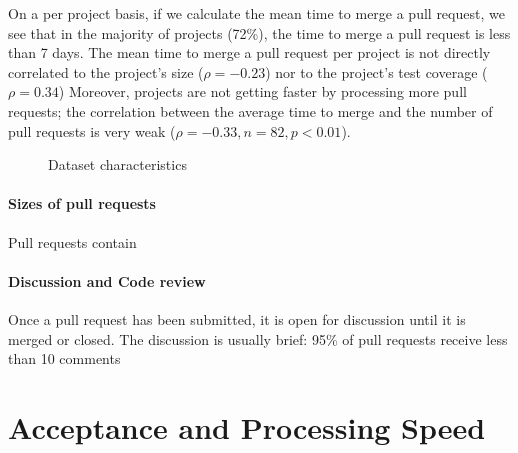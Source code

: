\documentclass{sig-alternate}
\begin{document}
On a per project basis, if we calculate the mean time to merge a pull request,
we see that in the majority of projects (72\%), the time to merge a pull
request is less than 7 days. The mean time to merge a pull request per project
is not directly correlated to the project's size ($\rho = -0.23$) nor to the
project's test coverage ($\rho = 0.34$) Moreover, projects are not getting
faster by processing more pull requests; the correlation between the average
time to merge and the number of pull requests is very weak ($\rho = -0.33, n =
82, p < 0.01$).

\begin{figure*}
\centering
{}
\caption{Dataset characteristics}
\end{figure*}

\paragraph*{Sizes of pull requests}

Pull requests contain 

\paragraph*{Discussion and Code review}

Once a pull request has been submitted, it is open for discussion until
it is merged or closed. The discussion is usually brief: 95\% of pull
requests receive less than 10 comments

\section{Acceptance and Processing Speed}
\label{sec:accrej}
\end{document}
